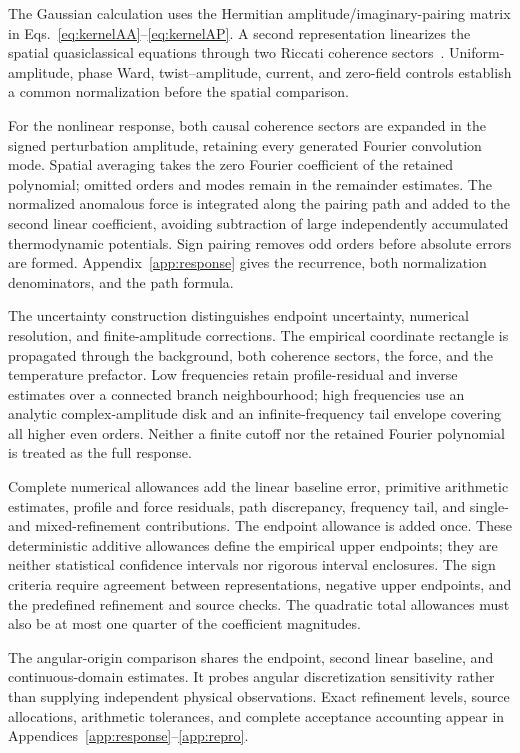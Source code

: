 The Gaussian calculation uses the Hermitian amplitude/imaginary-pairing matrix in Eqs.~\eqref{eq:kernelAA}--\eqref{eq:kernelAP}. A second representation linearizes the spatial quasiclassical equations through two Riccati coherence sectors~\cite{Eilenberger1968,Eschrig2000}. Uniform-amplitude, phase Ward, twist--amplitude, current, and zero-field controls establish a common normalization before the spatial comparison.

For the nonlinear response, both causal coherence sectors are expanded in the signed perturbation amplitude, retaining every generated Fourier convolution mode. Spatial averaging takes the zero Fourier coefficient of the retained polynomial; omitted orders and modes remain in the remainder estimates. The normalized anomalous force is integrated along the pairing path and added to the second linear coefficient, avoiding subtraction of large independently accumulated thermodynamic potentials. Sign pairing removes odd orders before absolute errors are formed. Appendix~\ref{app:response} gives the recurrence, both normalization denominators, and the path formula.

The uncertainty construction distinguishes endpoint uncertainty, numerical resolution, and finite-amplitude corrections. The empirical coordinate rectangle is propagated through the background, both coherence sectors, the force, and the temperature prefactor. Low frequencies retain profile-residual and inverse estimates over a connected branch neighbourhood; high frequencies use an analytic complex-amplitude disk and an infinite-frequency tail envelope covering all higher even orders. Neither a finite cutoff nor the retained Fourier polynomial is treated as the full response.

Complete numerical allowances add the linear baseline error, primitive arithmetic estimates, profile and force residuals, path discrepancy, frequency tail, and single- and mixed-refinement contributions. The endpoint allowance is added once. These deterministic additive allowances define the empirical upper endpoints; they are neither statistical confidence intervals nor rigorous interval enclosures. The sign criteria require agreement between representations, negative upper endpoints, and the predefined refinement and source checks. The quadratic total allowances must also be at most one quarter of the coefficient magnitudes.

The angular-origin comparison shares the endpoint, second linear baseline, and continuous-domain estimates. It probes angular discretization sensitivity rather than supplying independent physical observations. Exact refinement levels, source allocations, arithmetic tolerances, and complete acceptance accounting appear in Appendices~\ref{app:response}--\ref{app:repro}.
